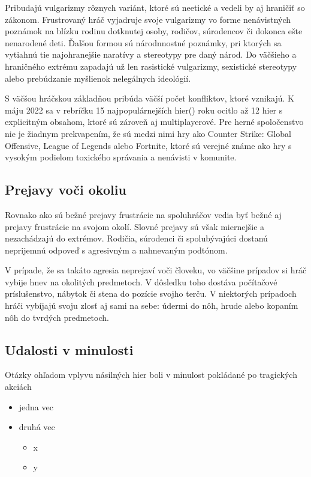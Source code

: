 \documentclass[10pt,twoside,slovak,a4paper]{article}
\begin{document}
Pribudajú vulgarizmy rôznych variánt, ktoré sú neetické a vedeli by aj hraničiť so zákonom. Frustrovaný hráč vyjadruje svoje vulgarizmy vo forme nenávistných poznámok na blízku rodinu dotknutej osoby, rodičov, súrodencov či dokonca ešte nenarodené deti. Ďalšou formou sú národnnostné poznámky, pri ktorých sa vytiahnú tie najohranejšie naratívy a stereotypy pre daný národ. Do väčšieho a hraničného extrému zapadajú už len rasistické vulgarizmy, sexistické stereotypy alebo prebúdzanie myšlienok nelegálnych ideológií.

S väčšou hráčskou základňou pribúda väčší počet konfliktov, ktoré vznikajú. K máju 2022 sa v rebríčku 15 najpopulárnejších hier(\cite{TopGames}) roku ocitlo až 12 hier s explicitným obsahom, ktoré sú zároveň aj multiplayerové. Pre herné spoločenstvo nie je žiadnym prekvapením, že sú medzi nimi hry ako Counter Strike: Global Offensive, League of Legends alebo Fortnite, ktoré sú verejné známe ako hry s vysokým podielom toxického správania a nenávisti v komunite.

\subsection{Prejavy voči okoliu} \label{ina:okolie}
Rovnako ako sú bežné prejavy frustrácie na spoluhráčov vedia byť bežné aj prejavy frustrácie na svojom okolí. Slovné prejavy sú však miernejšie a nezachádzajú do extrémov. Rodičia, súrodenci či spolubývajúci dostanú neprijemnú odpoveď s agresivným a nahnevaným podtónom. 

V prípade, že sa takáto agresia neprejaví voči človeku, vo väčšine prípadov si hráč vybije hnev na okolitých predmetoch. V dôsledku toho dostáva počítačové príslušenstvo, nábytok či stena do pozície svojho terču. V niektorých prípadoch hráči vybíjajú svoju zlosť aj sami na sebe: údermi do nôh, hrude alebo kopaním nôh do tvrdých predmetoch.

\subsection{Udalosti v minulosti} \label{ina:minulost}
Otázky ohľadom vplyvu násilných hier boli v minulost pokládané po tragických akciách

\begin{itemize}
\item jedna vec
\item druhá vec
	\begin{itemize}
	\item x
	\item y
	\end{itemize}
\end{itemize}
\end{document}
